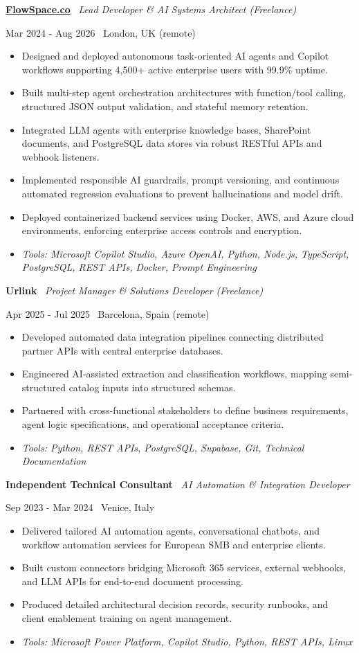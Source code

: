 \documentclass[a4paper,10pt]{article}
\newcommand{\role}[4]{%
  \vspace{2pt}\noindent
  \begin{minipage}[t]{0.70\textwidth}\raggedright\textbf{#1} \textbullet\ \textit{#3}\end{minipage}%
  \hfill
  \begin{minipage}[t]{0.28\textwidth}\raggedleft\footnotesize\color{gray}#2 \textbullet\ #4\end{minipage}%
  \vspace{1pt}%
}
\begin{document}
\role{\href{https://flowspace.co}{FlowSpace.co}}{Mar 2024 - Aug 2026}{Lead Developer \& AI Systems Architect (Freelance)}{London, UK (remote)}
\begin{itemize}
  \item Designed and deployed autonomous task-oriented AI agents and Copilot workflows supporting 4,500+ active enterprise users with 99.9\% uptime.
  \item Built multi-step agent orchestration architectures with function/tool calling, structured JSON output validation, and stateful memory retention.
  \item Integrated LLM agents with enterprise knowledge bases, SharePoint documents, and PostgreSQL data stores via robust RESTful APIs and webhook listeners.
  \item Implemented responsible AI guardrails, prompt versioning, and continuous automated regression evaluations to prevent hallucinations and model drift.
  \item Deployed containerized backend services using Docker, AWS, and Azure cloud environments, enforcing enterprise access controls and encryption.
  \item \textit{Tools: Microsoft Copilot Studio, Azure OpenAI, Python, Node.js, TypeScript, PostgreSQL, REST APIs, Docker, Prompt Engineering}
\end{itemize}

\role{Urlink}{Apr 2025 - Jul 2025}{Project Manager \& Solutions Developer (Freelance)}{Barcelona, Spain (remote)}
\begin{itemize}
  \item Developed automated data integration pipelines connecting distributed partner APIs with central enterprise databases.
  \item Engineered AI-assisted extraction and classification workflows, mapping semi-structured catalog inputs into structured schemas.
  \item Partnered with cross-functional stakeholders to define business requirements, agent logic specifications, and operational acceptance criteria.
  \item \textit{Tools: Python, REST APIs, PostgreSQL, Supabase, Git, Technical Documentation}
\end{itemize}

\role{Independent Technical Consultant}{Sep 2023 - Mar 2024}{AI Automation \& Integration Developer}{Venice, Italy}
\begin{itemize}
  \item Delivered tailored AI automation agents, conversational chatbots, and workflow automation services for European SMB and enterprise clients.
  \item Built custom connectors bridging Microsoft 365 services, external webhooks, and LLM APIs for end-to-end document processing.
  \item Produced detailed architectural decision records, security runbooks, and client enablement training on agent management.
  \item \textit{Tools: Microsoft Power Platform, Copilot Studio, Python, REST APIs, Linux}
\end{itemize}
\end{document}
